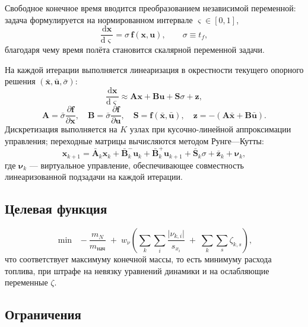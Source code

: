 \documentclass[11pt,a4paper]{article}
\newcommand{\vect}[1]{\bm{#1}}
\newcommand{\dd}{\mathrm{d}}
\begin{document}
Свободное конечное время вводится преобразованием независимой переменной: задача
формулируется на нормированном интервале $\varsigma\in[0,1]$,
\begin{equation}
\frac{\dd\vect{x}}{\dd\varsigma} = \sigma\,\vect{f}(\vect{x},\vect{u}),
\qquad \sigma \equiv t_f ,
\end{equation}
благодаря чему время полёта становится скалярной переменной задачи.

На каждой итерации выполняется линеаризация в окрестности текущего опорного
решения $\left(\bar{\vect{x}},\bar{\vect{u}},\bar\sigma\right)$:
\begin{equation}
\frac{\dd\vect{x}}{\dd\varsigma} \approx
  \vect{A}\vect{x} + \vect{B}\vect{u} + \vect{S}\sigma + \vect{z},
\end{equation}
\begin{equation}
\vect{A}=\bar\sigma\frac{\partial \vect{f}}{\partial \vect{x}},\quad
\vect{B}=\bar\sigma\frac{\partial \vect{f}}{\partial \vect{u}},\quad
\vect{S}=\vect{f}\left(\bar{\vect{x}},\bar{\vect{u}}\right),\quad
\vect{z}=-\left(\vect{A}\bar{\vect{x}}+\vect{B}\bar{\vect{u}}\right).
\end{equation}
Дискретизация выполняется на $K$ узлах при кусочно-линейной аппроксимации
управления; переходные матрицы вычисляются методом Рунге—Кутты:
\begin{equation}
\vect{x}_{k+1} = \bar{\vect{A}}_k\vect{x}_k
 + \bar{\vect{B}}^-_k\vect{u}_k + \bar{\vect{B}}^+_k\vect{u}_{k+1}
 + \bar{\vect{S}}_k\sigma + \bar{\vect{z}}_k + \boldsymbol{\nu}_k ,
\end{equation}
где $\boldsymbol{\nu}_k$ — виртуальное управление, обеспечивающее совместность
линеаризованной подзадачи на каждой итерации.

\subsection{Целевая функция}

\begin{equation}
\min\;\; -\frac{m_N}{m_{\text{нач}}}
 \;+\; w_\nu\left(\sum_{k}\sum_{i}\frac{\lvert\nu_{k,i}\rvert}{s_{x_i}}
 \;+\; \sum_{k}\sum_{s}\zeta_{k,s}\right),
\end{equation}
что соответствует максимуму конечной массы, то есть минимуму расхода топлива,
при штрафе на невязку уравнений динамики и на ослабляющие переменные $\zeta$.

\subsection{Ограничения}
\end{document}
